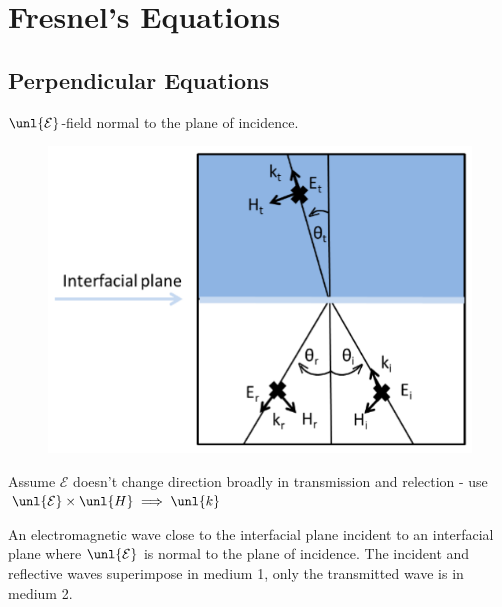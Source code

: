 \documentclass[a4paper, 11pt, normalem]{report}
\newcommand\E{\mathcal{E}}
\newcommand\uE{\unl{\E}}
\newcommand\vk{\unl{k}}
\begin{document}
\section{Fresnel's Equations}
\subsection{Perpendicular Equations}
$\uE$-field normal to the plane of incidence.

\begin{figure}[H]
	\centering
	\includegraphics[scale=0.4]{normfres.png}
\end{figure}

Assume $\E$ doesn't change direction broadly in transmission and relection - use $\uE \times \unl{H} \implies \vk$

An electromagnetic wave close to the interfacial plane incident to an interfacial plane where $\uE$ is normal to the plane of incidence.
The incident and reflective waves superimpose in medium 1, only the transmitted wave is in medium 2.
\end{document}
